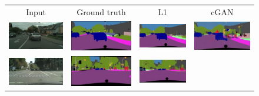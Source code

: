 \documentclass[10pt,twocolumn,letterpaper]{article}
\begin{document}
\begin{figure}[h]

\bgroup
 \def\arraystretch{0.2}
 \setlength\tabcolsep{0.2pt}

\begin{tabular}{cccc}
Input & Ground truth & L1 & cGAN \\
\includegraphics[width=0.25\linewidth]{figs/cityscapes_image_to_labels_latex/input_lindau_000000_000019_leftImg8bit.jpg} &
\includegraphics[width=0.25\linewidth]{figs/cityscapes_image_to_labels_latex/gt_lindau_000000_000019_leftImg8bit.jpg} &
\includegraphics[width=0.25\linewidth]{figs/cityscapes_image_to_labels_latex/L1_lindau_000000_000019_leftImg8bit.jpg} &
\includegraphics[width=0.25\linewidth]{figs/cityscapes_image_to_labels_latex/cGAN_lindau_000000_000019_leftImg8bit.jpg} \\
\includegraphics[width=0.25\linewidth]{figs/cityscapes_image_to_labels_latex/input_frankfurt_000001_044525_leftImg8bit.jpg} &
\includegraphics[width=0.25\linewidth]{figs/cityscapes_image_to_labels_latex/gt_frankfurt_000001_044525_leftImg8bit.jpg} &
\includegraphics[width=0.25\linewidth]{figs/cityscapes_image_to_labels_latex/L1_frankfurt_000001_044525_leftImg8bit.jpg} &

\end{tabular}
\end{figure}
\end{document}
